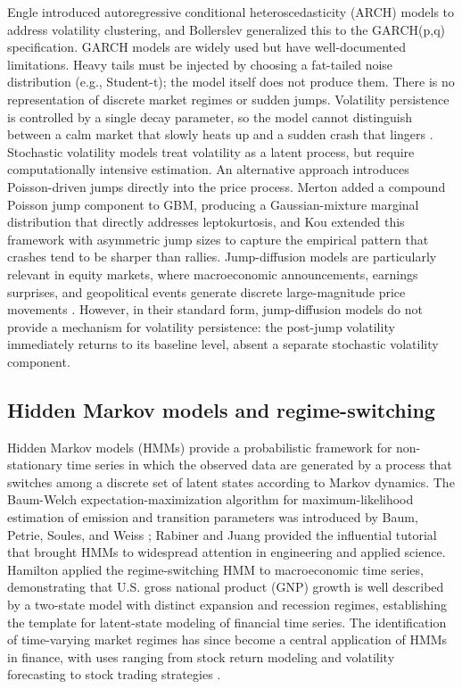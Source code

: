 Engle \cite{engle_1982} introduced autoregressive conditional heteroscedasticity (ARCH) models to address volatility clustering, and Bollerslev \cite{bollerslev_garch_1986} generalized this to the GARCH(p,q) specification. GARCH models are widely used but have well-documented limitations. Heavy tails must be injected by choosing a fat-tailed noise distribution (e.g., Student-t); the model itself does not produce them. There is no representation of discrete market regimes or sudden jumps. Volatility persistence is controlled by a single decay parameter, so the model cannot distinguish between a calm market that slowly heats up and a sudden crash that lingers \cite{diebold_inoue_2001}. Stochastic volatility models \cite{stein_stock_1991, heston_stochastic_1993} treat volatility as a latent process, but require computationally intensive estimation. An alternative approach introduces Poisson-driven jumps directly into the price process. Merton \cite{merton_jump_1976} added a compound Poisson jump component to GBM, producing a Gaussian-mixture marginal distribution that directly addresses leptokurtosis, and Kou \cite{kou_jump-diffusion_2002} extended this framework with asymmetric jump sizes to capture the empirical pattern that crashes tend to be sharper than rallies. Jump-diffusion models are particularly relevant in equity markets, where macroeconomic announcements, earnings surprises, and geopolitical events generate discrete large-magnitude price movements \cite{au_yeung_jump_2020}. However, in their standard form, jump-diffusion models do not provide a mechanism for volatility persistence: the post-jump volatility immediately returns to its baseline level, absent a separate stochastic volatility component.

\subsection{Hidden Markov models and regime-switching}
Hidden Markov models (HMMs) provide a probabilistic framework for non-stationary time series in which the observed data are generated by a process that switches among a discrete set of latent states according to Markov dynamics. The Baum-Welch expectation-maximization algorithm for maximum-likelihood estimation of emission and transition parameters was introduced by Baum, Petrie, Soules, and Weiss \cite{baum_1970}; Rabiner and Juang \cite{rabiner_introduction_1986} provided the influential tutorial that brought HMMs to widespread attention in engineering and applied science. Hamilton \cite{hamilton_1989} applied the regime-switching HMM to macroeconomic time series, demonstrating that U.S. gross national product (GNP) growth is well described by a two-state model with distinct expansion and recession regimes, establishing the template for latent-state modeling of financial time series. The identification of time-varying market regimes has since become a central application of HMMs in finance, with uses ranging from stock return modeling and volatility forecasting \cite{rossi_volatility_2006} to stock trading strategies \cite{nguyen_hidden_2018}.

